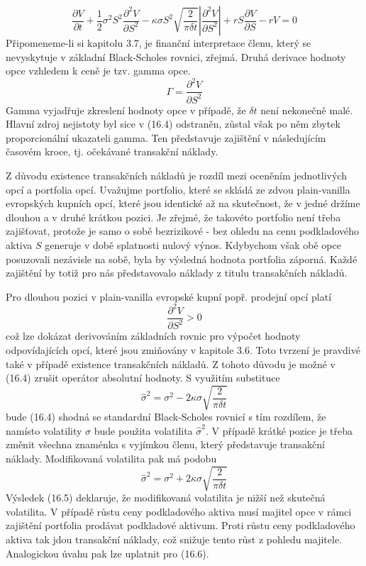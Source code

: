 \documentclass[a4paper]{book}
\begin{document}
\begin{equation}
\frac{\partial V}{\partial t} + \frac{1}{2} \sigma^2 S^2 \frac{\partial^2 V}{\partial S^2} - \kappa \sigma S^2 \sqrt{\frac{2}{\pi \delta t}} \left| \frac{\partial^2 V}{\partial S^2} \right| + r S \frac{\partial V}{\partial S} - rV = 0
\end{equation}
Připomeneme-li si kapitolu 3.7, je finanční interpretace členu, který se nevyskytuje v základní Black-Scholes rovnici, zřejmá. Druhá derivace hodnoty opce vzhledem k ceně je tzv. gamma opce.
\begin{equation*}
\Gamma = \frac{\partial^2 V}{\partial S^2}
\end{equation*}
Gamma vyjadřuje zkreslení hodnoty opce v případě, že $\delta t$ není nekonečně malé. Hlavní zdroj nejistoty byl sice v (16.4) odstraněn, zůstal však po něm zbytek proporcionální ukazateli gamma. Ten představuje zajištění v následujícím časovém kroce, tj. očekávané transakční náklady.

Z důvodu existence transakčních nákladů je rozdíl mezi oceněním jednotlivých opcí a portfolia opcí. Uvažujme portfolio, které se skládá ze zdvou plain-vanilla evropských kupních opcí, které jsou identické až na skutečnost, že v jedné držíme dlouhou a v druhé krátkou pozici. Je zřejmé, že takovéto portfolio není třeba zajišťovat, protože je samo o sobě bezrizikové - bez ohledu na cenu podkladového aktiva $S$ generuje v době splatnosti nulový výnos. Kdybychom však obě opce posuzovali nezávisle na sobě, byla by výsledná hodnota portfolia záporná. Každé zajištění by totiž pro nás představovalo náklady z titulu transakčních nákladů.

Pro dlouhou pozici v plain-vanilla evropské kupní popř. prodejní opcí platí
\begin{equation*}
\frac{\partial^2 V}{\partial S^2} > 0
\end{equation*}
což lze dokázat derivováním základních rovnic pro výpočet hodnoty odpovídajících opcí, které jsou zmiňovány v kapitole 3.6. Toto tvrzení je pravdivé také v případě existence transakčních nákladů. Z tohoto důvodu je možné v (16.4) zrušit operátor absolutní hodnoty. S využitím substituce
\begin{equation}
\hat{\sigma}^2 = \sigma^2 - 2 \kappa \sigma \sqrt{\frac{2}{\pi \delta t}}
\end{equation}
bude (16.4) shodná se standardní Black-Scholes rovnicí s tím rozdílem, že namísto volatility $\sigma$ bude použita volatilita $\hat{\sigma}^2$. V případě krátké pozice je třeba změnit všechna znaménka s vyjímkou členu, který představuje transakční náklady. Modifikovaná volatilita pak má podobu
\begin{equation}
\hat{\sigma}^2 = \sigma^2 + 2 \kappa \sigma \sqrt{\frac{2}{\pi \delta t}}
\end{equation}
Výsledek (16.5) deklaruje, že modifikovaná volatilita je nižší než skutečná volatilita. V případě růstu ceny podkladového aktiva musí majitel opce v rámci zajištění portfolia prodávat podkladové aktivum. Proti růstu ceny podkladového aktiva tak jdou transakční náklady, což snižuje tento růst z pohledu majitele. Analogickou úvahu pak lze uplatnit pro (16.6).
\end{document}
